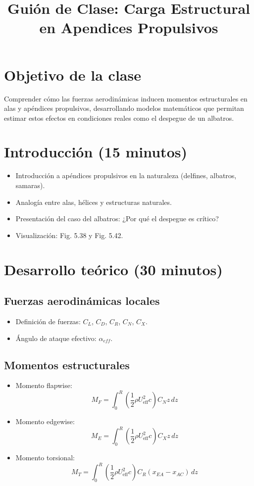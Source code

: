 \documentclass[12pt]{article}
\title{Guión de Clase: Carga Estructural en Apendices Propulsivos}
\author{}
\date{}
\begin{document}
\maketitle

\section*{Objetivo de la clase}
Comprender cómo las fuerzas aerodinámicas inducen momentos estructurales en alas y apéndices propulsivos, desarrollando modelos matemáticos que permitan estimar estos efectos en condiciones reales como el despegue de un albatros.

\section{Introducción (15 minutos)}
\begin{itemize}
    \item Introducción a apéndices propulsivos en la naturaleza (delfines, albatros, samaras).
    \item Analogía entre alas, hélices y estructuras naturales.
    \item Presentación del caso del albatros: ¿Por qué el despegue es crítico?
    \item Visualización: Fig. 5.38 y Fig. 5.42.
\end{itemize}

\section{Desarrollo teórico (30 minutos)}
\subsection{Fuerzas aerodinámicas locales}
\begin{itemize}
    \item Definición de fuerzas: $C_L$, $C_D$, $C_R$, $C_N$, $C_X$.
    \item Ángulo de ataque efectivo: $\alpha_{eff}$.
\end{itemize}

\subsection{Momentos estructurales}
\begin{itemize}
    \item Momento flapwise:
    \[
    M_F = \int_0^R \left( \frac{1}{2} \rho U_{\text{eff}}^2 c \right) C_N z \, dz
    \]
    \item Momento edgewise:
    \[
    M_E = \int_0^R \left( \frac{1}{2} \rho U_{\text{eff}}^2 c \right) C_X z \, dz
    \]
    \item Momento torsional:
    \[
    M_T = \int_0^R \left( \frac{1}{2} \rho U_{\text{eff}}^2 c \right) C_R (x_{EA} - x_{AC}) \, dz
    \]
\end{itemize}
\end{document}
